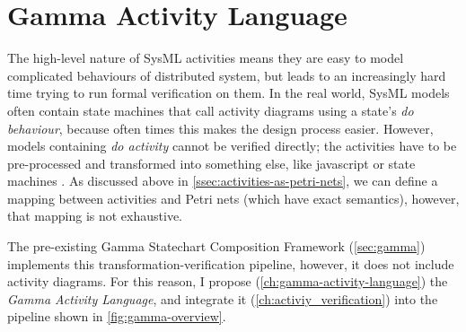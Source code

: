 \chapter{Gamma Activity Language}\label{ch:gamma-activity-language}

The high-level nature of SysML activities means they are easy to model complicated behaviours of distributed system, but leads to an increasingly hard time trying to run formal verification on them. In the real world, SysML models often contain state machines that call activity diagrams using a state's \emph{do behaviour}, because often times this makes the design process easier. However, models containing \emph{do activity} cannot be verified directly; the activities have to be pre-processed and transformed into something else, like javascript or state machines \cite{10.1145/3417990.3421407}. As discussed above in \autoref{ssec:activities-as-petri-nets}, we can define a mapping between activities and Petri nets (which have exact semantics), however, that mapping is not exhaustive.

The pre-existing Gamma Statechart Composition Framework (\autoref{sec:gamma}) implements this transformation-verification pipeline, however, it does not include activity diagrams. For this reason, I propose (\autoref{ch:gamma-activity-language}) the \emph{Gamma Activity Language}, and integrate it (\autoref{ch:activiy_verification}) into the pipeline shown in \autoref{fig:gamma-overview}.




